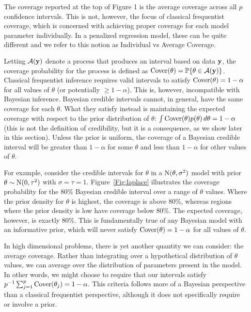 The coverage reported at the top of Figure 1 is the average coverage across all $p$ confidence intervals. This is not, however, the focus of classical frequentist coverage, which is concerned with achieving proper coverage for each model parameter individually. In a penalized regression model, these can be quite different and we refer to this notion as Individual vs Average Coverage.


Letting $\mathcal{A}(\mathbf{y})$ denote a process that produces an interval based on data $\mathbf{y}$, the coverage probability for the process is defined as $\textrm{Cover}(\theta) = \mathbb{P}\{\theta \in \mathcal{A}(\mathbf{y})\}$. Classical frequentist inference requires valid intervals to satisfy $\textrm{Cover}(\theta) = 1 - \alpha$ for all values of $\theta$ (or potentially $\ge 1 - \alpha$). This is, however, incompatible with Bayesian inference. Bayesian credible intervals cannot, in general, have the same coverage for each $\theta$. What they satisfy instead is maintaining the expected coverage with respect to the prior distribution of $\theta$: $\int \textrm{Cover}(\theta)p(\theta) \, d\theta = 1 - \alpha$ (this is not the definition of credibility, but it is a consequence, as we show later in this section). Unless the prior is uniform, the coverage of a Bayesian credible interval will be greater than $1-\alpha$ for some $\theta$ and less than $1-\alpha$ for other values of $\theta$.

For example, consider the credible intervals for $\theta$ in a $\textrm{N}(\theta, \sigma^2)$ model with prior $\theta \sim \textrm{N}(0, \tau^2)$ with $\sigma = \tau = 1$. Figure~\ref{Fig:laplace} illustrates the coverage probability for the 80\% Bayesian credible interval over a range of $\theta$ values. Where the prior density for $\theta$ is highest, the coverage is above 80\%, whereas regions where the prior density is low have coverage below 80\%. The expected coverage, however, is exactly 80\%. This is fundamentally true of any Bayesian model with an informative prior, which will never satisfy $\textrm{Cover}(\theta) = 1 - \alpha$ for all values of $\theta$.

In high dimensional problems, there is yet another quantity we can consider: the average coverage. Rather than integrating over a hypothetical distribution of $\theta$ values, we can average over the distribution of parameters present in the model. In other words, we might choose to require that our intervals satisfy $p^{-1} \sum_{j=1}^p \textrm{Cover}(\theta_j) = 1-\alpha$. This criteria follows more of a Bayesian perspective than a classical frequentist perspective, although it does not specifically require or involve a prior.

